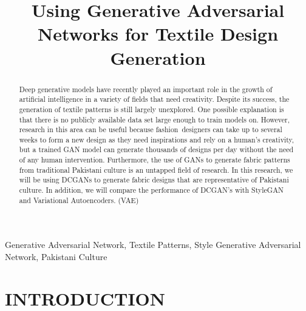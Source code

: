 \documentclass[conference]{IEEEtran}
\begin{document}
\title{Using Generative Adversarial Networks for Textile Design Generation}

    
\author{
\and
{}
\and
{}
}


\maketitle

\begin{abstract}
Deep generative models have recently played an important role in the growth of artificial intelligence in a variety of fields that need creativity. Despite its success, the generation of textile patterns is still largely unexplored. One possible explanation is that there is no publicly available data set large enough to train models on. However, research in this area can be useful because fashion designers can take up to several weeks to form a new design as they need inspirations and rely on a human's creativity, but a trained GAN model can generate thousands of designs per day without the need of any human intervention. Furthermore, the use of GANs to generate fabric patterns from traditional Pakistani culture is an untapped field of research. In this research, we will be using DCGANs to generate fabric designs that are representative of Pakistani culture. In addition, we will compare the performance of DCGAN's with StyleGAN and Variational Autoencoders. (VAE)

\end{abstract}

\begin{IEEEkeywords}
Generative Adversarial Network, Textile Patterns, Style Generative Adversarial Network, Pakistani Culture
\end{IEEEkeywords}

\section{INTRODUCTION}
\end{document}
